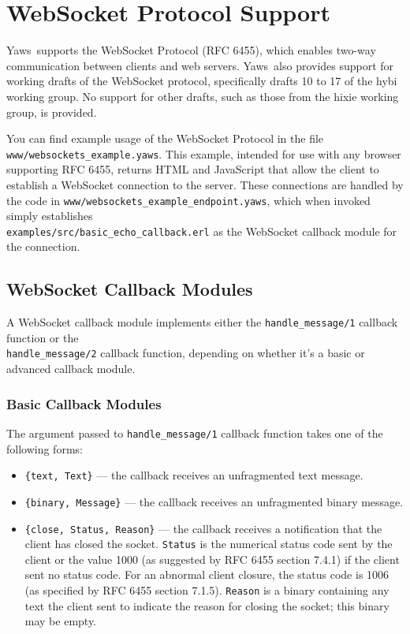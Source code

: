 \documentclass[11pt,oneside,english]{book}
\newcommand{\Yaws}            %
        {{\sc Yaws}}
\begin{document}
\chapter{WebSocket Protocol Support}
\label{websockets}

\Yaws\ supports the WebSocket Protocol (RFC 6455), which enables
two-way communication between clients and web servers. \Yaws\ also
provides support for working drafts of the WebSocket protocol,
specifically drafts 10 to 17 of the hybi working group. No support for
other drafts, such as those from the hixie working group, is provided.

You can find example usage of the WebSocket Protocol in the file
\verb+www/websockets_example.yaws+. This example, intended for use
with any browser supporting RFC 6455, returns HTML and JavaScript that
allow the client to establish a WebSocket connection to the
server. These connections are handled by the code in
\verb+www/websockets_example_endpoint.yaws+, which when invoked simply
establishes \\ \verb+examples/src/basic_echo_callback.erl+ as the
WebSocket callback module for the connection.

\section{WebSocket Callback Modules}

A WebSocket callback module implements either the
\verb+handle_message/1+ callback function or the
\\ \verb+handle_message/2+ callback function, depending on whether
it's a basic or advanced callback module.

\subsection{Basic Callback Modules}

The argument passed to \verb+handle_message/1+ callback function takes
one of the following forms:

\begin{itemize}

\item \verb+{text, Text}+ --- the callback receives an unfragmented
  text message.

\item \verb+{binary, Message}+ --- the callback receives an
  unfragmented binary message.

\item \verb+{close, Status, Reason}+ --- the callback receives a
  notification that the client has closed the socket. \verb+Status+ is the
  numerical status code sent by the client or the value 1000 (as suggested
  by RFC 6455 section 7.4.1) if the client sent no status code. For an
  abnormal client closure, the status code is 1006 (as specified by RFC
  6455 section 7.1.5). \verb+Reason+ is a binary containing any text the
  client sent to indicate the reason for closing the socket; this binary
  may be empty.

\end{itemize}
\end{document}
